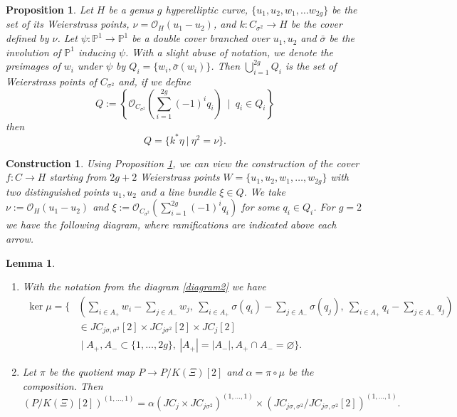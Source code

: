 \documentclass[10pt,a4paper]{amsart}
\newtheorem{prop}{Proposition}
\newtheorem{construction}{Construction}
\newtheorem{lem}{Lemma}
\newcommand{\s}{\sigma}
\begin{document}
\begin{prop}
\label{bundles}
    Let $H$ be a genus $g$ hyperelliptic curve, $\{u_1, u_2, w_1, \ldots w_{2g}\}$ be the set of its Weierstrass points, $\nu = \mathcal{O}_H(u_1-u_2)$, and $k: C_{\sigma^2} \to H$ be the cover defined by $\nu$. Let $\psi: \mathbb{P}^1 \to \mathbb{P}^1$ be a double cover branched over $u_1, u_2$ and $\bar{\sigma}$ be the involution of $\mathbb{P}^1$ inducing $\psi$. With a slight abuse of notation, we denote the preimages of $w_i$ under $\psi$ by $Q_i = \{w_i, \bar\sigma(w_i)\}$. 
    Then $ \bigcup_{i=1}^{2g} Q_i$ is the set of Weierstrass points of $C_{\sigma^2}$ and, if we define $$Q := \left\{\mathcal{O}_{C_{\sigma^2}}\left(\sum_{i=1}^{2g}(-1)^iq_i\right) \ \mid \ q_i \in Q_i\right\}$$ then $$Q = \{k^*\eta \ | \ \eta^2 = \nu\}.$$
\end{prop}

\begin{construction}
\label{construction}
    Using Proposition \ref{bundles}, we can view the construction of the cover $f:C \to H$ starting from $2g+2$ Weierstrass points $W = \{u_1, u_2, w_1,\ldots, w_{2g}\}$ with two distinguished points $u_1, u_2$ and a line bundle $\xi \in Q$. We take $\nu := \mathcal{O}_H(u_1-u_2)$ and $\xi := \mathcal{O}_{C_{\sigma^2}}(\sum_{i=1}^{2g}(-1)^iq_i)$ for some $q_i \in Q_i$. For $g=2$ we have the following diagram, where ramifications are indicated above each arrow. 
    \begin{center}
        \label{diagram2}
    \end{center}
\end{construction}

\begin{lem}
\begin{enumerate}
\label{geomprym}
    \item[i)] With the notation from the diagram \ref{diagram2} we have
    $$\begin{aligned}
\ker{\mu} = \Bigg\{ 
& \left( \sum_{i \in A_+} w_i - \sum_{j \in A_-} w_j, \ \sum_{i \in A_+} \s(q_i) - \sum_{j \in A_-} \s(q_j), \ \sum_{i \in A_+} q_i - \sum_{j \in A_-} q_j \right) \\
& \in JC_{j\sigma, \sigma^2}[2] \times JC_{j\sigma^2}[2] \times JC_{j}[2] \\
& \;\Bigg|\; A_+, A_- \subset \{1,\ldots,2g\}, \ |A_+| = |A_-|, A_+ \cap A_- = \varnothing \Bigg\}.
\end{aligned}$$
    \item[ii)] Let $\pi$ be the quotient map $P \to P/K(\Xi)[2]$ and $\alpha = \pi \circ \mu$ be the composition. Then $$(P/K(\Xi)[2])^{(1,\ldots,1)} = \alpha(JC_{j}\times JC_{j\s^2})^{(1,\ldots,1)} \times (JC_{j\s, \s^2}/JC_{j\s, \s^2}[2])^{(1,\ldots,1)}.$$
\end{enumerate}
    
\end{lem}
\end{document}
